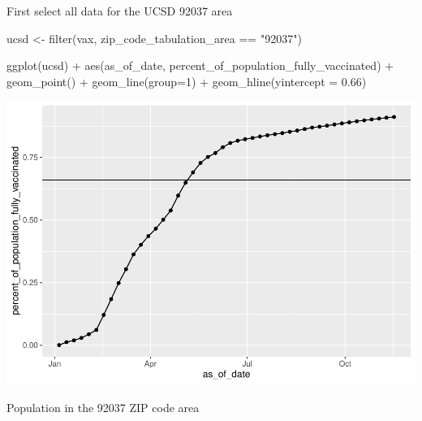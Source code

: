 \documentclass[
]{article}
\newenvironment{Shaded}{\begin{snugshade}}{\end{snugshade}}
\newcommand{\AttributeTok}[1]{\textcolor[rgb]{0.77,0.63,0.00}{#1}}
\newcommand{\DecValTok}[1]{\textcolor[rgb]{0.00,0.00,0.81}{#1}}
\newcommand{\FloatTok}[1]{\textcolor[rgb]{0.00,0.00,0.81}{#1}}
\newcommand{\FunctionTok}[1]{\textcolor[rgb]{0.00,0.00,0.00}{#1}}
\newcommand{\NormalTok}[1]{#1}
\newcommand{\OtherTok}[1]{\textcolor[rgb]{0.56,0.35,0.01}{#1}}
\newcommand{\SpecialCharTok}[1]{\textcolor[rgb]{0.00,0.00,0.00}{#1}}
\newcommand{\StringTok}[1]{\textcolor[rgb]{0.31,0.60,0.02}{#1}}
\begin{document}
First select all data for the UCSD 92037 area

\begin{Shaded}
\begin{Highlighting}[]
\NormalTok{ucsd }\OtherTok{\textless{}{-}} \FunctionTok{filter}\NormalTok{(vax, zip\_code\_tabulation\_area }\SpecialCharTok{==} \StringTok{"92037"}\NormalTok{)}
\end{Highlighting}
\end{Shaded}

\begin{Shaded}
\begin{Highlighting}[]
\FunctionTok{ggplot}\NormalTok{(ucsd) }\SpecialCharTok{+}
  \FunctionTok{aes}\NormalTok{(as\_of\_date, percent\_of\_population\_fully\_vaccinated) }\SpecialCharTok{+}
  \FunctionTok{geom\_point}\NormalTok{() }\SpecialCharTok{+}
  \FunctionTok{geom\_line}\NormalTok{(}\AttributeTok{group=}\DecValTok{1}\NormalTok{) }\SpecialCharTok{+}
  \FunctionTok{geom\_hline}\NormalTok{(}\AttributeTok{yintercept =} \FloatTok{0.66}\NormalTok{)}
\end{Highlighting}
\end{Shaded}

\includegraphics{class17_files/figure-latex/unnamed-chunk-26-1.pdf}

Population in the 92037 ZIP code area

\begin{Shaded}
\end{Shaded}
\end{document}
